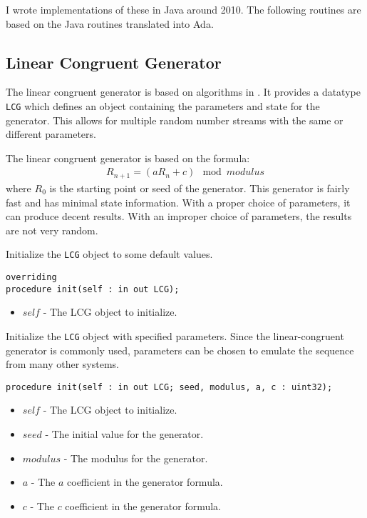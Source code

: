 \documentclass[10pt, openany]{book}
\newcommand{\datatype}[1]{\texttt{#1}}
\begin{document}
I wrote implementations of these in Java around 2010.  The following routines are based on the Java routines translated into Ada.

\subsection{Linear Congruent Generator}
The linear congruent generator is based on algorithms in \cite{NR-C}.  It provides a datatype \datatype{LCG} which defines an object containing the parameters and state for the generator.  This allows for multiple random number streams with the same or different parameters.

The linear congruent generator is based on the formula:
\begin{align*}
  R_{n+1} = (aR_n + c) \mod modulus
\end{align*}
where $R_0$ is the starting point or seed of the generator.  This generator is fairly fast and has minimal state information.  With a proper choice of parameters, it can produce decent results.  With an improper choice of parameters, the results are not very random.

Initialize the \datatype{LCG} object to some default values.
\begin{lstlisting}
overriding
procedure init(self : in out LCG);
\end{lstlisting}
\begin{itemize}
  \item $self$ - The LCG object to initialize.
\end{itemize}

Initialize the \datatype{LCG} object with specified parameters.  Since the linear-congruent generator is commonly used, parameters can be chosen to emulate the sequence from many other systems.
\begin{lstlisting}
procedure init(self : in out LCG; seed, modulus, a, c : uint32);
\end{lstlisting}
\begin{itemize}
  \item $self$ - The LCG object to initialize.
  \item $seed$ - The initial value for the generator.
  \item $modulus$ - The modulus for the generator.
  \item $a$ - The $a$ coefficient in the generator formula.
  \item $c$ - The $c$ coefficient in the generator formula.
\end{itemize}
\end{document}
